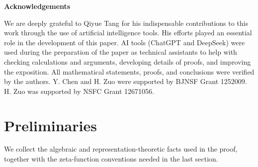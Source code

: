 \documentclass[11pt,a4paper]{article}
\numberwithin{equation}{section}
\theoremstyle{definition}
\begin{document}

\begin{center}
\bf{Acknowledgements}
\end{center}

We are deeply grateful to Qiyue Tang for his indispensable contributions to this work through the use of artificial intelligence tools. His efforts played an essential role in the development of this paper. AI tools (ChatGPT and DeepSeek) were used during the preparation of the paper as technical assistants to help with checking calculations and arguments, developing details of proofs, and improving the exposition. All mathematical statements, proofs, and conclusions were verified by the authors. Y. Chen and H. Zuo were supported by BJNSF Grant 1252009. H. Zuo was supported by NSFC Grant 12671056.

\section{Preliminaries}\label{sec:preliminaries}
We collect the algebraic and representation-theoretic facts used in
the proof, together with the zeta-function conventions needed in the
last section.
\end{document}
